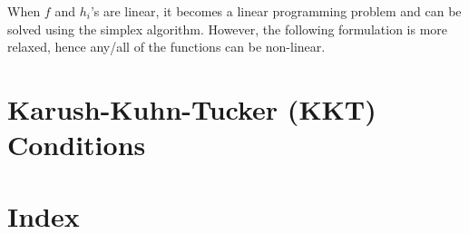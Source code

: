 \documentclass[conference,final,11pt,technote,onecolumn]{IEEEtran}\usepackage[]{graphicx}\usepackage[]{color}
\begin{document}
When $f$ and $h_i$'s are linear, it becomes a linear programming problem and can be solved using the simplex algorithm. However, the following formulation is more relaxed, hence any/all of the functions can be non-linear.

\section{Karush-Kuhn-Tucker (KKT) Conditions}
\label{term:kkt_conditions}

	
	
	\pagebreak
	\section*{Index}
	\printindex
	
\end{document}
